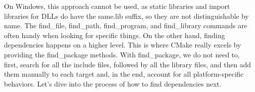 On Windows, this approach cannot be used, as static libraries and import libraries for DLLs do have the same.lib suffix, so they are not distinguishable by name. The find\_file, find\_path, find\_program, and find\_library commands are often handy when looking for specific things. On the other hand, finding dependencies happens on a higher level. This is where CMake really excels by providing the find\_package methods. With find\_package, we do not need to, first, search for all the include files, followed by all the library files, and then add them manually to each target and, in the end, account for all platform-specific behaviors. Let's dive into the process of how to find dependencies next.




